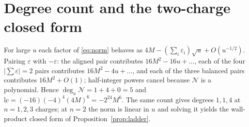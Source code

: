 \documentclass[11pt]{article}
\theoremstyle{definition}
\theoremstyle{remark}
\begin{document}
\section{Degree count and the two-charge closed form}
\label{app:degree}

For large $u$ each factor of \eqref{eq:norm} behaves as
$4M-(\sum_i\varepsilon_i)\sqrt u+O(u^{-1/2})$. Pairing $\varepsilon$ with
$-\varepsilon$: the aligned pair contributes $16M^2-16u+\dots$, each of the
four $|\sum\varepsilon|=2$ pairs contributes $16M^2-4u+\dots$, and each of the
three balanced pairs contributes $16M^2+O(1)$; half-integer powers cancel
because $\mathcal N$ is a polynomial. Hence $\deg_u\mathcal N=1+4+0=5$ and
$\mathrm{lc}=(-16)(-4)^4(4M)^6=-2^{24}M^6$. The same count gives degrees
$1,1,4$ at $n=1,2,3$ charges; at $n=2$ the norm is linear in $u$ and solving it
yields the wall-product closed form of Proposition~\ref{prop:ladder}.
\end{document}
